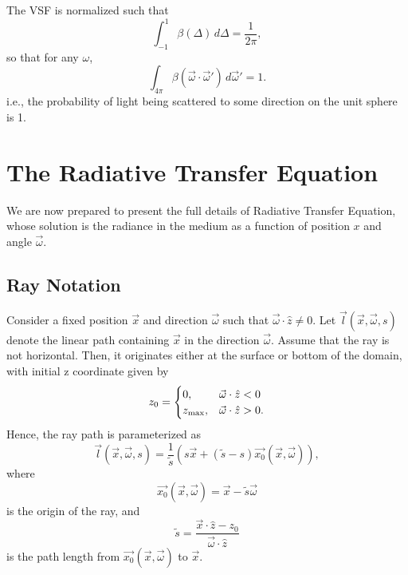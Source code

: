 The VSF is normalized such that
\begin{equation*}
  \int_{-1}^1\beta(\Delta)\, d\Delta=\frac{1}{2\pi},
\end{equation*}
so that for any $\omega$,
\begin{equation*}
  \int_{4\pi}\beta(\vec{\omega}\cdot\vec{\omega}')\, d\vec{\omega}' = 1.
\end{equation*}
i.e., the probability of light being scattered to some direction on the unit sphere is 1.

\section{The Radiative Transfer Equation}
We are now prepared to present the full details of Radiative Transfer Equation, whose solution is the radiance in the medium as a function of position $x$ and angle $\vec{\omega}$.

\subsection{Ray Notation}
Consider a fixed position $\vec{x}$ and direction $\vec{\omega}$ such that
$\vec{\omega} \cdot \hat{z} \neq 0$.
Let $\vec{l}(\vec{x}, \vec{\omega}, s)$ denote the linear path containing $\vec{x}$ in the direction $\vec{\omega}$.
Assume that the ray is not horizontal.
Then, it originates either at the surface or bottom of the domain, with initial z coordinate given by
\begin{equation*}
  z_0 =
   \begin{cases}
    0, & \vec{\omega} \cdot \hat{z} < 0 \\
    {z_{\max}}, & \vec{\omega} \cdot \hat{z} > 0.
  \end{cases}
\end{equation*}
Hence, the ray path is parameterized as
\begin{equation}
  \vec{l}(\vec{x}, \vec{\omega}, s) = \frac{1}{\tilde{s}} (s\vec{x} + (\tilde{s} - s)\vec{x_0}(\vec{x}, \vec{\omega})),
  \label{eqn:ray_path}
\end{equation}
where
\begin{equation}
  \vec{x_0}(\vec{x}, \vec{\omega}) = \vec{x} - \tilde{s} \vec{\omega}
  \label{eqn:x_0}
\end{equation}
is the origin of the ray, and
\begin{equation*}
  \tilde{s} = \frac{\vec{x} \cdot \hat{z} - z_0}{\vec{\omega} \cdot \hat{z}}
\end{equation*}
is the path length from $\vec{x_0}(\vec{x}, \vec{\omega})$ to $\vec{x}$.

